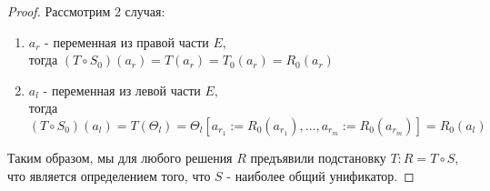 \begin{proof}
		Рассмотрим 2 случая:
		\begin{enumerate}
			\item $a_r$ - переменная из правой части $E$, \\
			тогда $(T \circ S_0)(a_r) = T(a_r) = T_0(a_r) = R_0(a_r)$
			\item $a_l$ - переменная из левой части $E$, \\
			тогда $(T \circ S_0)(a_l) = T(\Theta_l) = \Theta_l[a_{r_1}:=R_0(a_{r_1}),...,a_{r_m}:=R_0(a_{r_m})] = R_0(a_l)$
		\end{enumerate}
	Таким образом, мы для любого решения $R$ предъявили подстановку $T : R = T \circ S$, что является определением того, что $S$ - наиболее общий унификатор.
	\end{proof}
